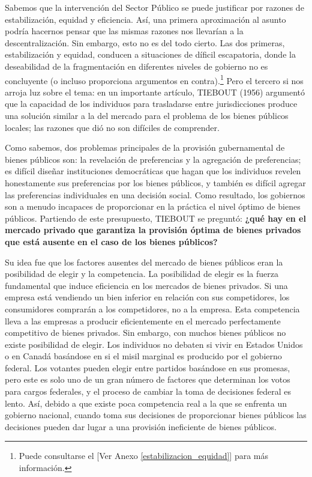 \documentclass[10pt,a4paper]{article}
\newcommand{\authorfont}[1]{{\fontfamily{EBGaramond-TLF}\selectfont #1}}
\begin{document}
Sabemos que la intervención del Sector Público se puede justificar por razones de estabilización, equidad y eficiencia. Así, una primera aproximación al asunto podría hacernos pensar que las mismas razones nos llevarían a la descentralización. Sin embargo, esto no es del todo cierto. Las dos primeras, estabilización y equidad, conducen a situaciones de díficil escapatoria, donde la deseabilidad de la fragmentación en diferentes niveles de gobierno no es concluyente (o incluso proporciona argumentos en contra).\footnote{%
    Puede consultarse el [\authorfont{Ver Anexo \ref{estabilizacion_equidad}}] para más información.
} Pero el tercero si nos arroja luz sobre el tema: en un importante artículo, TIEBOUT (1956) argumentó que la capacidad de los individuos para trasladarse entre jurisdicciones produce una solución similar a la del mercado para el problema de los bienes públicos locales; las razones que dió no son difíciles de comprender. 

Como sabemos, dos problemas principales de la provisión gubernamental de bienes públicos son: la revelación de preferencias y la agregación de preferencias; es difícil diseñar instituciones democráticas que hagan que los individuos revelen honestamente sus preferencias por los bienes públicos, y también es difícil agregar las preferencias individuales en una decisión social. Como resultado, los gobiernos son a menudo incapaces de proporcionar en la práctica el nivel óptimo de bienes públicos. Partiendo de este presupuesto, TIEBOUT se preguntó: \textbf{¿qué hay en el mercado privado que garantiza la provisión óptima de bienes privados que está ausente en el caso de los bienes públicos?} 

Su idea fue que los factores ausentes del mercado de bienes públicos eran la posibilidad de elegir y la competencia. La posibilidad de elegir es la fuerza fundamental que induce eficiencia en los mercados de bienes privados. Si una empresa está vendiendo un bien inferior en relación con sus competidores, los consumidores comprarán a los competidores, no a la empresa. Esta competencia lleva a las empresas a producir eficientemente en el mercado perfectamente competitivo de bienes privados. Sin embargo, con muchos bienes públicos no existe posibilidad de elegir. Los individuos no debaten si vivir en Estados Unidos o en Canadá basándose en si el misil marginal es producido por el gobierno federal. Los votantes pueden elegir entre partidos basándose en sus promesas, pero este es solo uno de un gran número de factores que determinan los votos para cargos federales, y el proceso de cambiar la toma de decisiones federal es lento. Así, debido a que existe poca competencia real a la que se enfrenta un gobierno nacional, cuando toma sus decisiones de proporcionar bienes públicos las decisiones pueden dar lugar a una provisión ineficiente de bienes públicos.
\end{document}
